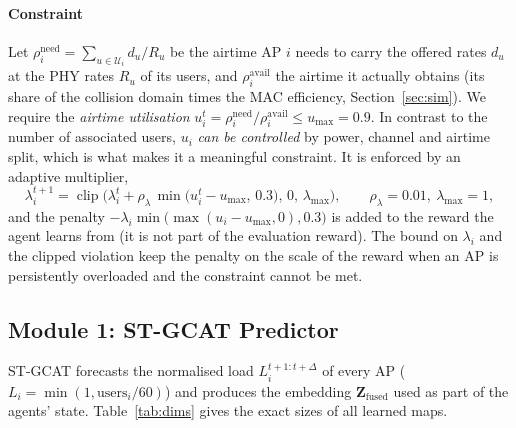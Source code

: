 \paragraph{Constraint} Let $\rho^{\mathrm{need}}_i=\sum_{u\in\mathcal{U}_i} d_u/R_u$ be the airtime AP $i$ needs to carry the offered rates $d_u$ at the PHY rates $R_u$ of its users, and $\rho^{\mathrm{avail}}_i$ the airtime it actually obtains (its share of the collision domain times the MAC efficiency, Section~\ref{sec:sim}). We require the \emph{airtime utilisation} $u_i^t=\rho^{\mathrm{need}}_i/\rho^{\mathrm{avail}}_i\le u_{\max}=0.9$. In contrast to the number of associated users, $u_i$ \emph{can be controlled} by power, channel and airtime split, which is what makes it a meaningful constraint. It is enforced by an adaptive multiplier,
\begin{equation}
  \lambda_i^{t+1}=\operatorname{clip}\!\Big(\lambda_i^{t}+\rho_\lambda\,\min\!\big(u_i^t-u_{\max},\,0.3\big),\,0,\,\lambda_{\max}\Big),\qquad \rho_\lambda=0.01,\ \lambda_{\max}=1,
  \label{eq:lagr}
\end{equation}
and the penalty $-\lambda_i\min\big(\max(u_i-u_{\max},0),0.3\big)$ is added to the reward the agent learns from (it is not part of the evaluation reward). The bound on $\lambda_i$ and the clipped violation keep the penalty on the scale of the reward when an AP is persistently overloaded and the constraint cannot be met.

\subsection{Module 1: ST-GCAT Predictor}
\label{sec:stgcat}

ST-GCAT forecasts the normalised load $L_i^{t+1:t+\Delta}$ of every AP ($L_i=\min(1,\text{users}_i/60)$) and produces the embedding $\mathbf{Z}_{\mathrm{fused}}$ used as part of the agents' state. Table~\ref{tab:dims} gives the exact sizes of all learned maps.

